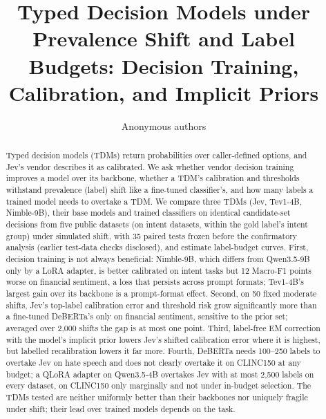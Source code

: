 \documentclass[10pt]{article}
\title{Typed Decision Models under Prevalence Shift and Label Budgets: Decision Training, Calibration, and Implicit Priors}
\author{\name Anonymous authors}
\begin{document}
\maketitle

\begin{abstract}
Typed decision models (TDMs) return probabilities over caller-defined options, and Jev's vendor describes it as
calibrated. We ask whether vendor decision training improves a model over its backbone, whether a TDM's calibration
and thresholds withstand prevalence (label) shift like a fine-tuned classifier's, and how many labels a trained model
needs to overtake a TDM. We compare three TDMs (Jev, Tev1-4B, Nimble-9B), their base models and trained classifiers on
identical candidate-set decisions from five public datasets (on intent datasets, within the gold label's intent group)
under simulated shift, with 35 paired tests frozen before the confirmatory analysis (earlier test-data checks
disclosed), and estimate label-budget curves. First, decision training is not always beneficial: Nimble-9B, which
differs from Qwen3.5-9B only by a LoRA adapter, is better calibrated on intent tasks but 12 Macro-F1 points worse on
financial sentiment, a loss that persists across prompt formats; Tev1-4B's largest gain over its backbone is a
prompt-format effect. Second, on 50 fixed moderate shifts, Jev's top-label calibration error and threshold risk grow
significantly more than a fine-tuned DeBERTa's only on financial sentiment, sensitive to the prior set; averaged over
2{,}000 shifts the gap is at most one point. Third, label-free EM correction with the model's implicit prior lowers
Jev's shifted calibration error where it is highest, but labelled recalibration lowers it far more. Fourth, DeBERTa
needs 100--250 labels to overtake Jev on hate speech and does not clearly overtake it on CLINC150 at any budget; a
QLoRA adapter on Qwen3.5-4B overtakes Jev with at most 2{,}500 labels on every dataset, on CLINC150 only marginally
and not under in-budget selection. The TDMs tested are neither uniformly better than their backbones nor uniquely
fragile under shift; their lead over trained models depends on the task.
\end{abstract}














\appendix
\makeatletter
\setlength{\@fptop}{0pt}
\setlength{\@fpsep}{14pt plus 4pt}
\setlength{\@fpbot}{0pt plus 1fil}
\makeatother
\renewcommand{\topfraction}{0.95}
\renewcommand{\bottomfraction}{0.9}
\renewcommand{\textfraction}{0.05}
\renewcommand{\floatpagefraction}{0.85}
\setcounter{topnumber}{5}
\setcounter{bottomnumber}{3}
\setcounter{totalnumber}{8}

\end{document}
